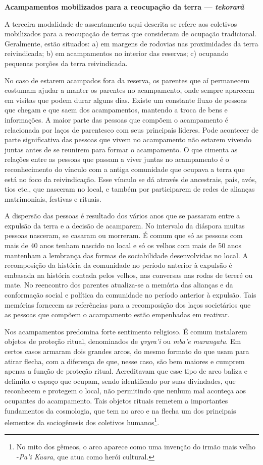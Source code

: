 \textbf{Acampamentos mobilizados para a reocupação da terra ---
\emph{tekorarã}}

A terceira modalidade de assentamento aqui descrita se refere aos
coletivos mobilizados para a reocupação de terras que consideram de
ocupação tradicional. Geralmente, estão situados: a) em margens de
rodovias nas proximidades da terra reivindicada; b) em acampamentos no
interior das reservas; c) ocupando pequenas porções da terra
reivindicada.

No caso de estarem acampados fora da reserva, os parentes que aí
permanecem costumam ajudar a manter os parentes no acampamento, onde
sempre aparecem em visitas que podem durar alguns dias. Existe um
constante fluxo de pessoas que chegam e que saem dos acampamentos,
mantendo a troca de bens e informações. A maior parte das pessoas que
compõem o acampamento é relacionada por laços de parentesco com seus
principais líderes. Pode acontecer de parte significativa das pessoas
que vivem no acampamento não estarem vivendo juntas antes de se reunirem
para formar o acampamento. O que cimenta as relações entre as pessoas
que passam a viver juntas no acampamento é o reconhecimento do vínculo
com a antiga comunidade que ocupava a terra que está no foco da
reivindicação. Esse vínculo se dá através de ancestrais, pais, avós,
tios etc., que nasceram no local, e também por participarem de redes de
alianças matrimoniais, festivas e rituais.

A dispersão das pessoas é resultado dos vários anos que se passaram
entre a expulsão da terra e a decisão de acamparem. No intervalo da
diáspora muitas pessoas nasceram, se casaram ou morreram. É comum que só
as pessoas com mais de 40 anos tenham nascido no local e só os velhos
com mais de 50 anos mantenham a lembrança das formas de sociabilidade
desenvolvidas no local. A recomposição da história da comunidade no
período anterior à expulsão é embasada na história contada pelos velhos,
nas conversas nas rodas de tereré ou mate. No reencontro dos parentes
atualiza-se a memória das alianças e da conformação social e política da
comunidade no período anterior à expulsão. Tais memórias fornecem as
referências para a recomposição dos laços societários que as pessoas que
compõem o acampamento estão empenhadas em reativar.

Nos acampamentos predomina forte sentimento religioso. É comum
instalarem objetos de proteção ritual, denominados de \emph{yvyra'i} ou
\emph{mba'e marangatu}. Em certos casos armaram dois grandes arcos, do
mesmo formato do que usam para atirar flecha, com a diferença de que,
nesse caso, são bem maiores e cumprem apenas a função de proteção
ritual. Acreditavam que esse tipo de arco baliza e delimita o espaço que
ocupam, sendo identificado por suas divindades, que reconhecem e
protegem o local, não permitindo que nenhum mal aconteça aos ocupantes
do acampamento. Tais objetos rituais remetem a importantes fundamentos
da cosmologia, que tem no arco e na flecha um dos principais elementos
da sociogênesis dos coletivos humanos\footnote{No mito dos gêmeos, o
  arco aparece como uma invenção do irmão mais velho -\emph{Pa'i Kuara},
  que atua como herói cultural.}.

